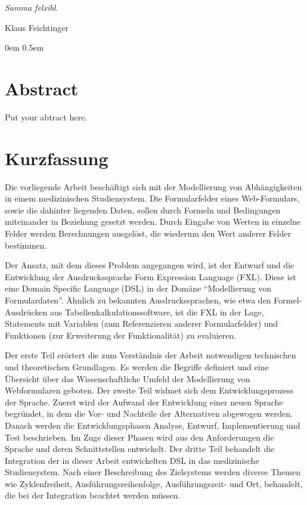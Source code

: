 \documentclass [11pt,smallheadings, a4paper]{report}
\begin{document}
\newenvironment{myquote}%
{\begin{quote}\small}%
{\end{quote}}%


\noindent
\emph{Samma felxibl.}
\begin{flushright}
Klaus Feichtinger
\end{flushright}
\pagestyle{headings}
\tableofcontents


\pagestyle{headings}


\parindent0em
\parskip0.5em

\renewcommand{\baselinestretch}{1.0}\normalsize

\chapter*{Abstract}
Put your abtract here.

\chapter*{Kurzfassung}
Die vorliegende Arbeit beschäftigt sich mit der Modellierung von Ab\-hän\-gig\-kei\-ten in einem medizinischen Studiensystem. Die Formularfelder eines Web-Formulars, sowie die dahinter liegenden Daten, sollen durch Formeln und Bedingungen miteinander in Beziehung gesetzt werden. Durch Eingabe von Werten in einzelne Felder werden Berechnungen ausgelöst, die wiederum den Wert anderer Felder bestimmen.

Der Ansatz, mit dem dieses Problem angegangen wird, ist der Entwurf und die Entwicklung der Ausdruckssprache Form Expression Language (FXL). Diese ist eine Domain Specific Language (DSL) in der Domäne ``Modellierung von Formulardaten''. Ähnlich zu bekannten Ausdruckssprachen, wie etwa den Formel-Ausdrücken aus Tabellenkalkulationssoftware, ist die FXL in der Lage, Statements mit Variablen (zum Referenzieren anderer Formularfelder) und Funktionen (zur Erweiterung der Funktionalität) zu evaluieren.

Der erste Teil erörtert die zum Verständnis der Arbeit notwendigen technischen und theoretischen Grundlagen. Es werden die Begriffe definiert und eine Über\-sicht über das Wissenschaftliche Umfeld der Modellierung von Webformularen geboten.
Der zweite Teil widmet sich dem Entwicklungsprozess der Sprache. Zuerst wird der Aufwand der Entwicklung einer neuen Sprache begründet, in dem die Vor- und Nachteile der Alternativen abgewogen werden. Danach werden die Entwicklungsphasen Analyse, Entwurf, Implementierung und Test beschrieben. Im Zuge dieser Phasen wird aus den Anforderungen die Sprache und deren Schnittstellen entwickelt.
Der dritte Teil behandelt die Integration der in dieser Arbeit entwickelten DSL in das medizinische Studiensystem. Nach einer Beschreibung des Zielsystems werden diverse Themen wie Zyklenfreiheit, Ausführungsreihenfolge, Ausführungszeit- und Ort, behandelt, die bei der Integration beachtet werden müssen.
\end{document}

